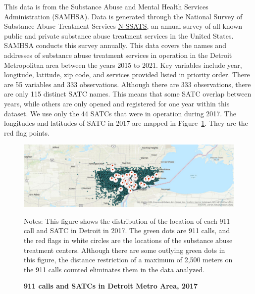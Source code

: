 \documentclass[12pt]{article}
\begin{document}
This data is from the Substance Abuse and Mental Health Services Administration (SAMHSA). Data is generated through the National Survey of Substance Abuse Treatment Services \href{https://www.samhsa.gov/data/data-we-collect/n-ssats-national-survey-substance-abuse-treatment-services}{N-SSATS}, an annual survey of all known public and private substance abuse treatment services in the United States. SAMHSA conducts this survey annually.  This data covers the names and addresses of substance abuse treatment services in operation in the Detroit Metropolitan area between the years 2015 to 2021. Key variables include year, longitude, latitude, zip code, and services provided listed in priority order. There are 55 variables and 333 observations. Although there are 333 observations, there are only 115 distinct SATC names. This means that some SATC overlap between years, while others are only opened and registered for one year within this dataset. \footnotemark[2]We use only the 44 SATCs that were in operation during 2017. The longitudes and latitudes of SATC in 2017 are mapped in Figure~\ref{fig:Figure2}. They are the red flag points. 

\begin{figure}[h!]
    \centering
\includegraphics[width=0.75\linewidth]{Reproducibility Package/Visual Graphics/ArcGIS_Map.jpg}
    \caption{\textbf{911 calls and SATCs in Detroit Metro Area, 2017}}
    \label{fig:Figure2}
     \centering\footnotesize{Notes: This figure shows the distribution of the location of each 911 call and SATC in Detroit in 2017. The green dots are 911 calls, and the red flags in white circles are the locations of the substance abuse treatment centers. Although there are some outlying green dots in this figure, the distance restriction of a maximum of 2,500 meters on the 911 calls counted eliminates them in the data analyzed.}
    
\end{figure}
\end{document}
